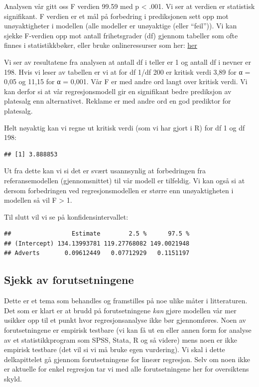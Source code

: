 \documentclass[
]{article}
\begin{document}
Analysen vår gitt oss F verdien 99.59 med p \textless{} .001. Vi ser at
verdien er statistisk signifikant. F verdien er et mål på forbedring i
prediksjonen sett opp mot unøyaktigheter i modellen (alle modeller er
unøyaktige (eller ``feil'')). Vi kan sjekke F-verdien opp mot antall
frihetsgrader (df) gjennom tabeller som ofte finnes i statistikkbøker,
eller bruke onlineressurser som her:
\href{http://www.stat.purdue.edu/~jtroisi/STAT350Spring2015/tables/FTable.pdf}{her}

Vi ser av resultatene fra analysen at antall df i teller er 1 og antall
df i nevner er 198. Hvis vi leser av tabellen er vi at for df 1/df 200
er kritisk verdi 3,89 for α = 0,05 og 11,15 for α = 0,001. Vår F er med
andre ord langt over kritisk verdi. Vi kan derfor si at vår
regresjonsmodell gir en signifikant bedre prediksjon av platesalg enn
alternativet. Reklame er med andre ord en god prediktor for platesalg.

Helt nøyaktig kan vi regne ut kritisk verdi (som vi har gjort i R) for
df 1 og df 198:

\begin{verbatim}
## [1] 3.888853
\end{verbatim}

Ut fra dette kan vi si det er svært usannsynlig at forbedringen fra
referansemodellen (gjennomsnittet) til vår modell er tilfeldig. Vi kan
også si at dersom forbedringen ved regresjonsmodellen er større enn
unøyaktigheten i modellen så vil F \textgreater{} 1.

Til slutt vil vi se på konfidensintervallet:

\begin{verbatim}
##                 Estimate        2.5 %      97.5 %
## (Intercept) 134.13993781 119.27768082 149.0021948
## Adverts       0.09612449   0.07712929   0.1151197
\end{verbatim}

\hypertarget{sjekk-av-forutsetningene}{%
\subsection{Sjekk av forutsetningene}\label{sjekk-av-forutsetningene}}

Dette er et tema som behandles og framstilles på noe ulike måter i
litteraturen. Det som er klart er at brudd på forutsetningene \emph{kan}
gjøre modellen vår mer usikker opp til et punkt hvor regresjonsanalyse
ikke bør gjennomføres. Noen av forutsetningene er empirisk testbare (vi
kan få ut en eller annen form for analyse av et statistikkprogram som
SPSS, Stata, R og så videre) mens noen er ikke empirisk testbare (det
vil si vi må bruke egen vurdering). Vi skal i dette delkapittelet gå
gjennom forutsetningene for lineær regresjon. Selv om noen ikke er
aktuelle for enkel regresjon tar vi med alle forutsetningene her for
oversiktens skyld.
\end{document}
